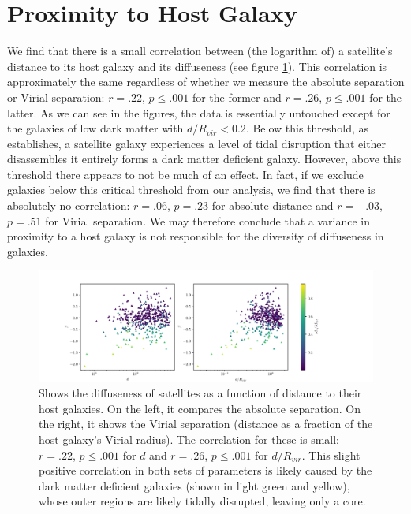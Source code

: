 \section{Proximity to Host Galaxy}
We find that there is a small correlation between (the logarithm of) a satellite's distance to its host galaxy and its diffuseness (see figure \ref{fig:beta-d}). This correlation is approximately the same regardless of whether we measure the absolute separation or Virial separation: $r = .22$, $p \leq .001$ for the former and $r = .26$, $p \leq .001$ for the latter. As we can see in the figures, the data is essentially untouched except for the galaxies of low dark matter with $d / R_{vir} < 0.2$. Below this threshold, as \cite{morenoGalaxiesLackingDark2022} establishes, a satellite galaxy experiences a level of tidal disruption that either disassembles it entirely forms a dark matter deficient galaxy. However, above this threshold there appears to not be much of an effect. In fact, if we exclude galaxies below this critical threshold from our analysis, we find that there is absolutely no correlation: $r = .06$, $p = .23$ for absolute distance and $r = -.03$, $p = .51$ for Virial separation. We may therefore conclude that a variance in proximity to a host galaxy is not responsible for the diversity of diffuseness in galaxies.

\begin{figure}
    \centering
    \includegraphics*[width=\textwidth*11/10]{figs/me/beta-d.pdf}
    \caption{
        Shows the diffuseness of satellites as a function of distance to their host galaxies. On the left, it compares the absolute separation. On the right, it shows the Virial separation (distance as a fraction of the host galaxy's Virial radius). The correlation for these is small: $r = .22$, $p \leq .001$ for $d$ and $r = .26$, $p \leq .001$ for $d / R_{vir}$. This slight positive correlation in both sets of parameters is likely caused by the dark matter deficient galaxies (shown in light green and yellow), whose outer regions are likely tidally disrupted, leaving only a core.
    }
    \label{fig:beta-d}
\end{figure}

